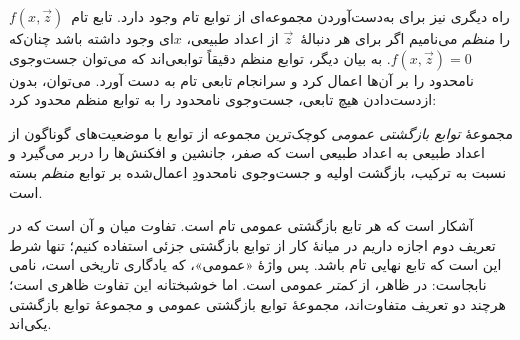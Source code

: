 \documentclass[../../../include/open-logic-section]{subfiles}
\begin{document}

راه دیگری نیز برای به‌دست‌آوردن مجموعه‌ای از توابع تام وجود دارد. تابع
تام~$f(x,\vec z)$ را 
\emph{منظم} می‌نامیم اگر برای هر دنبالهٔ~$\vec z$ از اعداد طبیعی،
$x$ای وجود داشته باشد چنان‌که $f(x,\vec z)=0$. به بیان دیگر، توابع
منظم دقیقاً توابعی‌اند که می‌توان جست‌وجوی نامحدود را بر آن‌ها اعمال
کرد و سرانجام تابعی تام به دست آورد. می‌توان، بدون ازدست‌دادن هیچ
تابعی، جست‌وجوی نامحدود را به توابع منظم محدود کرد:

\begin{defn}
مجموعهٔ 
\emph{توابع بازگشتی عمومی} کوچک‌ترین مجموعه از توابع با موضعیت‌های
گوناگون از اعداد طبیعی به اعداد طبیعی است که صفر، جانشین و افکنش‌ها را
دربر می‌گیرد و نسبت به ترکیب، بازگشت اولیه و جست‌وجوی نامحدودِ
اعمال‌شده بر توابع 
\emph{منظم} بسته است.
\end{defn}

آشکار است که هر تابع بازگشتی عمومی تام است. تفاوت میان
 و 
 آن است که در تعریف دوم اجازه داریم در
میانهٔ کار از توابع بازگشتی جزئی استفاده کنیم؛ تنها شرط این است که
تابع نهایی تام باشد. پس واژهٔ «عمومی»، که یادگاری تاریخی است، نامی
نابجاست: در ظاهر، 
 از
\emph{کمتر} عمومی است. اما خوشبختانه این تفاوت ظاهری است؛ هرچند دو
تعریف متفاوت‌اند، مجموعهٔ توابع بازگشتی عمومی و مجموعهٔ توابع بازگشتی
یکی‌اند.
\end{document}
